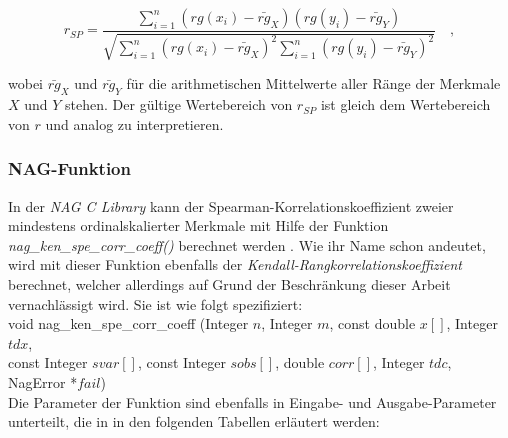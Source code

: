 \begin{equation*}
    r_{SP}=\dfrac{\sum_{i=1}^{n}{(rg(x_i)-\bar{rg}_X)(rg(y_i)-\bar{rg}_Y)}}{\sqrt{\sum_{i=1}^{n}{(rg(x_i)-\bar{rg}_X)^2\sum_{i=1}^{n}{(rg(y_i)-\bar{rg}_Y)^2}}}} \quad ,
\end{equation*}

\noindent wobei $\bar{rg}_X$ und $\bar{rg}_Y$ für die arithmetischen Mittelwerte aller Ränge der Merkmale $X$ und $Y$ stehen. Der gültige Wertebereich von $r_{SP}$ ist gleich dem Wertebereich von $r$ und analog zu interpretieren.

\subsubsection{NAG-Funktion}

In der {\it NAG C Library} kann der Spearman-Korrelationskoeffizient zweier mindestens ordinalskalierter Merkmale mit Hilfe der Funktion {\it nag\_ken\_spe\_corr\_coeff()} berechnet werden \cite{nag:g02brc}. Wie ihr Name schon andeutet, wird mit dieser Funktion ebenfalls der {\it Kendall-Rangkorrelationskoeffizient} berechnet, welcher allerdings auf Grund der Beschränkung dieser Arbeit vernachlässigt wird. Sie ist wie folgt spezifiziert:\\

\noindent void nag\_ken\_spe\_corr\_coeff (Integer $n$, Integer $m$, const double $x[]$, Integer $tdx$,\\
\hspace*{5mm} const Integer $svar[]$, const Integer $sobs[]$, double $corr[]$, Integer $tdc$,\\
\hspace*{5mm} NagError *$fail$)\\

\noindent Die Parameter der Funktion sind ebenfalls in Eingabe- und Ausgabe-Parameter unterteilt, die in in den folgenden Tabellen erläutert werden:\\

\\

